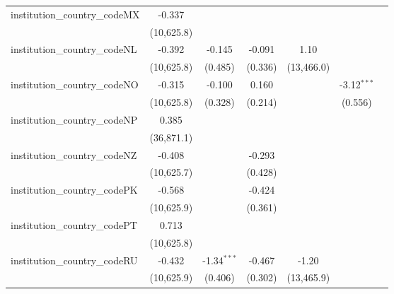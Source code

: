 \begin{tabular}{lcccccc}
   institution\_country\_codeMX          & -0.337        &               &               &             &               &   \\   
                                         & (10,625.8)    &               &               &             &               &   \\   
   institution\_country\_codeNL          & -0.392        & -0.145        & -0.091        & 1.10        &               &   \\   
                                         & (10,625.8)    & (0.485)       & (0.336)       & (13,466.0)  &               &   \\   
   institution\_country\_codeNO          & -0.315        & -0.100        & 0.160         &             & -3.12$^{***}$ &   \\   
                                         & (10,625.8)    & (0.328)       & (0.214)       &             & (0.556)       &   \\   
   institution\_country\_codeNP          & 0.385         &               &               &             &               &   \\   
                                         & (36,871.1)    &               &               &             &               &   \\   
   institution\_country\_codeNZ          & -0.408        &               & -0.293        &             &               &   \\   
                                         & (10,625.7)    &               & (0.428)       &             &               &   \\   
   institution\_country\_codePK          & -0.568        &               & -0.424        &             &               &   \\   
                                         & (10,625.9)    &               & (0.361)       &             &               &   \\   
   institution\_country\_codePT          & 0.713         &               &               &             &               &   \\   
                                         & (10,625.8)    &               &               &             &               &   \\   
   institution\_country\_codeRU          & -0.432        & -1.34$^{***}$ & -0.467        & -1.20       &               &   \\   
                                         & (10,625.9)    & (0.406)       & (0.302)       & (13,465.9)  &               &   \\   

\end{tabular}
